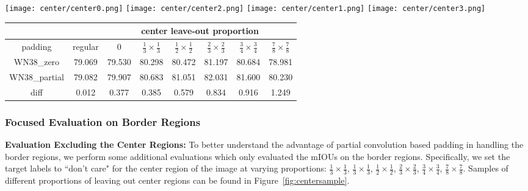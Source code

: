 \documentclass[10pt,twocolumn,letterpaper]{article}
\begin{document}
\begin{figure*}%
\centering
    \texttt{[image: center/center0.png]}
    \texttt{[image: center/center2.png]}
    \texttt{[image: center/center1.png]}
    \texttt{[image: center/center3.png]} 
\caption{Samples with different proportions of leaving out center regions.}
\label{fig:centersample}
\vspace{-0.2cm}
\end{figure*}\begin{table*}%
    \centering
    \begin{tabular}{c|c|cccccc}
    \multicolumn{1}{c}{} & \multicolumn{1}{c}{} & \multicolumn{6}{|c}{center leave-out proportion} \\
    \hline
    padding & regular & 0 & $\frac{1}{3}\times\frac{1}{3}$ & $\frac{1}{2}\times\frac{1}{2}$ & $\frac{2}{3}\times\frac{2}{3}$ & $\frac{3}{4}\times\frac{3}{4}$ & $\frac{7}{8}\times\frac{7}{8}$ \\
    \hline
    WN38\_zero & 79.069 &  79.530 &  80.298 & 80.472 & 81.197 & 80.684 & 78.981 \\
    WN38\_partial & 79.082 & 79.907 & 80.683 & 81.051 & 82.031 & 81.600 & 80.230 \\   
    \hline
    diff & 0.012 & 0.377 & 0.385 & 0.579 & 0.834 & 0.916 & 1.249 \\
    \end{tabular}
    \caption{Evaluation of segmentation results by leaving out different proportions of the center region. Explanation can be found in Section~\ref{sec:border}.}
    \label{tab:leaveout}
    \vspace{-0.2cm}
\end{table*}\subsubsection{Focused Evaluation on Border Regions}\label{sec:border}\textbf{Evaluation Excluding the Center Regions:} To better understand the advantage of partial convolution based padding in handling the border regions, we perform some additional evaluations which only evaluated the mIOUs on the border regions. Specifically, we set the target labels to ``don't care" for the center region of the image at varying proportions: $\frac{1}{3}\times\frac{1}{3}$, $\frac{1}{3}\times\frac{1}{3}$, $\frac{1}{2}\times\frac{1}{2}$, $\frac{2}{3}\times\frac{2}{3}$, $\frac{3}{4}\times\frac{3}{4}$, $\frac{7}{8}\times\frac{7}{8}$. Samples of different proportions of leaving out center regions can be found in Figure~\ref{fig:centersample}.
\end{document}
